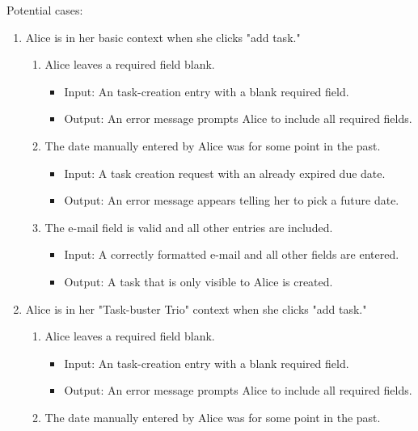 \documentclass{article}
\begin{document}
Potential cases:
\begin{enumerate}
    \item Alice is in her basic context when she clicks "add task."
    \begin{enumerate}
        \item Alice leaves a required field blank.
            \begin{itemize}
                \item Input: An task-creation entry with a blank required
field.
                \item Output: An error message prompts Alice to include all required fields.
            \end{itemize}
        \item The date manually entered by Alice was for some point in the past.
            \begin{itemize}
                \item Input: A task creation request with an already expired due date.
                \item Output: An error message appears telling her to pick a future date.
            \end{itemize}
        \item The e-mail field is valid and all other entries are included.
            \begin{itemize}
                \item Input: A correctly formatted e-mail and all other fields
are entered.
                \item Output: A task that is only visible to Alice is
created.
            \end{itemize}
    \end{enumerate}
\item Alice is in her "Task-buster Trio" context when she clicks "add
task."
     \begin{enumerate}
        \item Alice leaves a required field blank.
            \begin{itemize}
                \item Input: An task-creation entry with a blank required
field.
                \item Output: An error message prompts Alice to
include all required fields.
            \end{itemize}
        \item The date manually entered by Alice was for some point in
the past.
            \begin{itemize}

\end{itemize}
\end{enumerate}
\end{enumerate}
\end{document}
